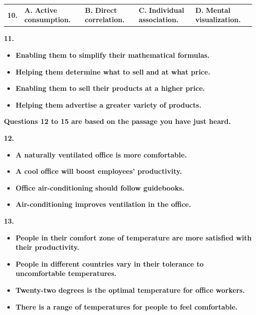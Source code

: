 \documentclass[UTF8,11pt]{ctexart}
\begin{document}
\noindent\begin{tabularx}{\linewidth}{@{}lXXXX@{}}\textbf{10.} & \textbf{A.} \textbf{Active consumption.} & \textbf{B.} \textbf{Direct correlation.} & \textbf{C.} \textbf{Individual association.} & \textbf{D.} \textbf{Mental visualization.}\\\end{tabularx}\par

\textbf{11.}


\begin{itemize}[leftmargin=2em,itemsep=.2em,topsep=.4em]\item[A.] \textbf{Enabling them to simplify their mathematical formulas.}
\item[B.] \textbf{Helping them determine what to sell and at what price.}
\item[C.] \textbf{Enabling them to sell their products at a higher price.}
\item[D.] \textbf{Helping them advertise a greater variety of products.}
\end{itemize}

\textbf{Questions 12 to 15 are based on the passage you have just heard.}


\textbf{12.}


\begin{itemize}[leftmargin=2em,itemsep=.2em,topsep=.4em]\item[A.] \textbf{A naturally ventilated office is more comfortable.}
\item[B.] \textbf{A cool office will boost employees' productivity.}
\item[C.] \textbf{Office air-conditioning should follow guidebooks.}
\item[D.] \textbf{Air-conditioning improves ventilation in the office.}
\end{itemize}

\textbf{13.}


\begin{itemize}[leftmargin=2em,itemsep=.2em,topsep=.4em]\item[A.] \textbf{People in their comfort zone of temperature are more satisfied with their productivity.}
\item[B.] \textbf{People in different countries vary in their tolerance to uncomfortable temperatures.}
\item[C.] \textbf{Twenty-two degrees is the optimal temperature for office workers.}
\item[D.] \textbf{There is a range of temperatures for people to feel comfortable.}
\end{itemize}
\end{document}
